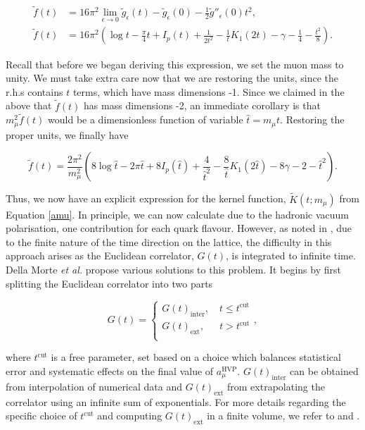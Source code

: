 \documentclass{article}
\numberwithin{equation}{section} %
\begin{document}
\begin{equation}
\begin{split}
\tilde{f}(t)&= 16\pi^2 \lim_{\epsilon\rightarrow 0}\tilde{g}_\epsilon(t) - \tilde{g}_\epsilon(0) - \frac{1}{2} \tilde{g}''_\epsilon(0)t^2,\\
\tilde{f}(t)&= 16\pi^2 (\log t - \frac{\pi}{4}t + I_p(t) + \frac{1}{2t^2} - \frac{1}{t}K_1(2t) - \gamma - \frac{1}{4} - \frac{t^2}{8}).
\end{split}
\end{equation}

Recall that before we began deriving this expression, we set the muon mass to unity. We must take extra care now that we are restoring the units, since the r.h.s contains $t$ terms, which have mass dimensions -1. Since we claimed in the above that $\tilde{f}(t)$ has mass dimensions -2, an immediate corollary is that $m_\mu^2\tilde{f}(t)$ would be a dimensionless function of variable $\hat{t}=m_\mu t$. Restoring the proper units, we finally have

\begin{equation}
\tilde{f}(t)= \frac{2\pi^2}{m_\mu^2}(8\log \hat{t} - 2\pi \hat{t} + 8I_p(\hat{t}) + \frac{4}{\hat{t}^2} - \frac{8}{\hat{t}}K_1(2\hat{t}) - 8\gamma - 2 - \hat{t}^2).
\label{ftilde final}
\end{equation}

Thus, we now have an explicit expression for the kernel function, $\tilde{K}(t;m_\mu)$ from Equation \ref{amu}. In principle, we can now calculate \amu due to the hadronic vacuum polarisation, one contribution for each quark flavour. However, as noted in \cite{dellamorte}, due to the finite nature of the time direction on the lattice, the difficulty in this approach arises as the Euclidean correlator, $G(t)$, is integrated to infinite time. Della Morte \textit{et al.} propose various solutions to this problem. It begins by first splitting the Euclidean correlator into two parts

\begin{equation}
G(t)=
\begin{cases}
G(t)_{\mathrm{inter}}, \quad t \leq t^{\mathrm{cut}} \\
G(t)_{\mathrm{ext}}, \,\,\,\quad t > t^{\mathrm{cut}} \\
\end{cases},
\end{equation}

\noindent where $t^{\mathrm{cut}}$ is a free parameter, set based on a choice which balances statistical error and systematic effects on the final value of $a_\mu^{\mathrm{HVP}}$. $G(t)_{\mathrm{inter}}$ can be obtained from interpolation of numerical data and $G(t)_{\mathrm{ext}}$ from extrapolating the correlator using an infinite sum of exponentials. For more details regarding the specific choice of $t^{\mathrm{cut}}$ and computing $G(t)_{\mathrm{ext}}$ in a finite volume, we refer to \cite{dellamorte} and \cite{vector}.
\end{document}
